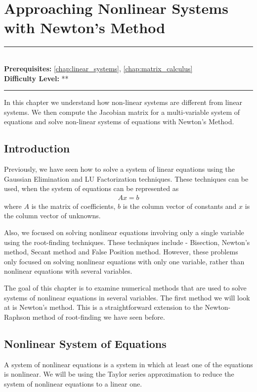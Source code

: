 \documentclass[book.tex]{subfiles}
\begin{document}
\chapter{Approaching Nonlinear Systems with Newton's Method}

\label{chap:nonlinear_newton}
\noindent\rule{11cm}{0.4pt} \\
\textbf{Prerequisites:} \autoref{chap:linear_systems}, \autoref{chap:matrix_calculus} \\ 
\textbf{Difficulty Level:} ** \\
\noindent\rule{11cm}{0.4pt}
\vspace{5mm}

In this chapter we understand how non-linear systems are different from linear systems. We then compute the Jacobian matrix for a multi-variable system of equations and solve non-linear systems of equations with Newton's Method.

\section{Introduction}
Previously, we have seen how to solve a system of linear equations using the Gaussian Elimination and LU Factorization techniques. These techniques can be used, when the system of equations can be represented as 
\begin{align}
Ax = b
\end{align}
where $A$ is the matrix of coefficients, $b$ is the column vector of constants and $x$ is the column vector of unknowns.

Also, we focused on solving nonlinear equations involving only a single variable using the root-finding techniques. These techniques include - Bisection, Newton's method, Secant method and False Position method. However, these problems only focused on solving nonlinear equations with only one variable, rather than nonlinear equations with several variables. 

The goal of this chapter is to examine numerical methods that are used to solve systems of nonlinear equations in several variables. The first method we will look at is Newton's method. This is a straightforward extension to the Newton-Raphson method of root-finding we have seen before. 


\section{Nonlinear System of Equations}
A system of nonlinear equations is a system in which at least one of the equations is nonlinear. We will be using the Taylor series approximation to reduce the system of nonlinear equations to a linear one. 
\end{document}
